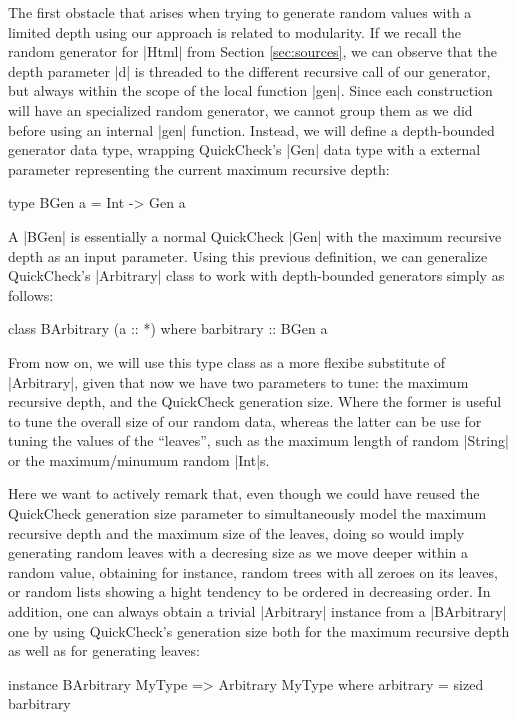 The first obstacle that arises when trying to generate random values with a
limited depth using our approach is related to modularity.
%
If we recall the random generator for |Html| from Section \ref{sec:sources}, we
can observe that the depth parameter |d| is threaded to the different recursive
call of our generator, but always within the scope of the local function |gen|.
%
Since each construction will have an specialized random generator, we cannot
group them as we did before using an internal |gen| function.
%
Instead, we will define a depth-bounded generator data type, wrapping
QuickCheck's |Gen| data type with a external parameter representing the current
maximum recursive depth:

\begin{code}
type BGen a = Int -> Gen a
\end{code}

A |BGen| is essentially a normal QuickCheck |Gen| with the maximum recursive
depth as an input parameter.
%
Using this previous definition, we can generalize QuickCheck's |Arbitrary| class
to work with depth-bounded generators simply as follows:

\begin{code}
class BArbitrary (a :: *) where
  barbitrary :: BGen a
\end{code}

From now on, we will use this type class as a more flexibe substitute of
|Arbitrary|, given that now we have two parameters to tune: the maximum
recursive depth, and the QuickCheck generation size.
%
Where the former is useful to tune the overall size of our random data, whereas
the latter can be use for tuning the values of the ``leaves'', such as the
maximum length of random |String| or the maximum/minumum random |Int|s.


Here we want to actively remark that, even though we could have reused the
QuickCheck generation size parameter to simultaneously model the maximum
recursive depth and the maximum size of the leaves, doing so would imply
generating random leaves with a decresing size as we move deeper within a random
value, obtaining for instance, random trees with all zeroes on its leaves, or
random lists showing a hight tendency to be ordered in decreasing order.
%
In addition, one can always obtain a trivial |Arbitrary| instance from a
|BArbitrary| one by using QuickCheck's generation size both for the maximum
recursive depth as well as for generating leaves:

\begin{code}
instance BArbitrary MyType => Arbitrary MyType where
  arbitrary = sized barbitrary
\end{code} %



